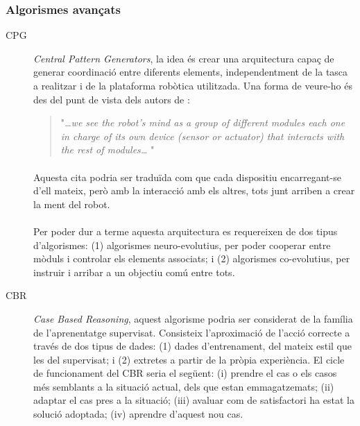 \documentclass[12pt,a4paper,final,twoside]{article}
\begin{document}
\subsubsection{Algorismes avançats}

\begin{description}

\item[CPG] \textit{Central Pattern Generators}, la idea és crear una arquitectura capaç de generar coordinació entre diferents elements, independentment de la tasca a realitzar i de la plataforma robòtica utilitzada. Una forma de veure-ho és des del punt de vista dels autors de \cite{Tellez2005a}:
\begin{quotation}
"\textit{\dots we see the robot’s mind as a group of different modules each one in charge of its own device (sensor or actuator) that interacts with the rest of modules\dots} "
\end{quotation}

\paragraph{}Aquesta cita podria ser traduïda com que cada dispositiu encarregant-se d'ell mateix, però amb la interacció amb els altres, tots junt arriben a crear la ment del robot.

\paragraph{}Per poder dur a terme aquesta arquitectura es requereixen de dos tipus d'algorismes: (1) algorismes neuro-evolutius, per poder cooperar entre mòduls i controlar els elements associats; i (2) algorismes co-evolutius, per instruir i arribar a un objectiu comú entre tots.


\item[CBR] \textit{Case Based Reasoning}, aquest algorisme podria ser considerat de la família de l'aprenentatge supervisat. Consisteix l'aproximació de l'acció correcte a través de dos tipus de dades: (1) dades d'entrenament, del mateix estil que les del supervisat; i (2) extretes a partir de la pròpia experiència. El cicle de funcionament del CBR seria el següent: (i) prendre el cas o els casos més semblants a la situació actual, dels que estan emmagatzemats; (ii) adaptar el cas pres a la situació; (iii) avaluar com de satisfactori ha estat la solució adoptada; (iv) aprendre d'aquest nou cas.


\end{description}
\end{document}
